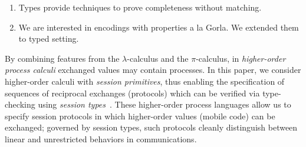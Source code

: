 \begin{enumerate}[1.]
	\item	Types provide techniques to prove completeness without matching. 
	\item	We are interested in encodings with properties a la Gorla. 
                We extended them to typed setting. 
\end{enumerate}

%

%

\noi 
By combining features from the $\lambda$-calculus and the $\pi$-calculus, 
in \emph{higher-order process calculi} exchanged values may contain  processes. 
In this paper, we consider higher-order calculi with \emph{session primitives},
thus enabling the specification of sequences of reciprocal exchanges (protocols)
which can be verified via type-checking using \emph{session types}~\cite{honda.vasconcelos.kubo:language-primitives}.
These higher-order process languages allow us to specify   
session protocols in which higher-order values 
(mobile code) can be exchanged; governed by session types, 
such protocols cleanly distinguish between 
linear and unrestricted behaviors in 
communications.

